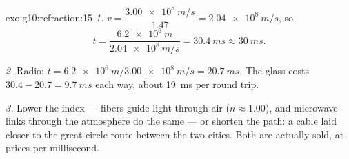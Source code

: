 \begin{solution}{exo:g10:refraction:15}
\emph{1.} $v = \dfrac{\qty{3.00e8}{m/s}}{1.47} = \qty{2.04e8}{m/s}$, so
\[
t = \frac{\qty{6.2e6}{m}}{\qty{2.04e8}{m/s}} = \qty{30.4}{ms} \approx
\qty{30}{ms}.
\]

\emph{2.} Radio: $t = \qty{6.2e6}{m}/\qty{3.00e8}{m/s} =
\qty{20.7}{ms}$. The glass costs $30.4 - 20.7 = \qty{9.7}{ms}$ each
way, about \qty{19}{ms} per round trip.

\emph{3.} Lower the index ---  fibers guide light through
air ($n \approx 1.00$), and microwave links through the atmosphere do
the same --- or shorten the path: a cable laid closer to the
great-circle route between the two cities. Both are actually sold, at
prices per millisecond.
\end{solution}

